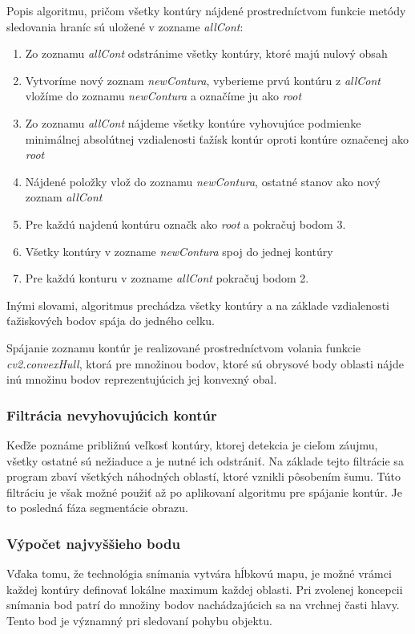 Popis algoritmu, pričom všetky kontúry nájdené prostredníctvom funkcie metódy sledovania hraníc sú uložené v zozname \textit{allCont}:
\begin{enumerate}
  \item Zo zoznamu \textit{allCont} odstránime všetky kontúry, ktoré majú nulový obsah
  \item Vytvoríme nový zoznam \textit{newContura}, vyberieme prvú kontúru z \textit{allCont} vložíme do zoznamu \textit{newContura} a označíme ju ako \textit{root}
  \item Zo zoznamu \textit{allCont} nájdeme všetky kontúre vyhovujúce podmienke minimálnej absolútnej vzdialenosti ťažísk kontúr oproti kontúre označenej ako \textit{root}  
  \item Nájdené položky vlož do zoznamu \textit{newContura}, ostatné stanov ako nový zoznam \textit{allCont}
  \item Pre každú najdenú kontúru označk ako \textit{root} a  pokračuj bodom 3.
  \item Všetky kontúry v zozname \textit{newContura} spoj do jednej kontúry
  \item Pre každú konturu v zozname \textit{allCont} pokračuj bodom 2.
  
\end{enumerate}
Inými slovami, algoritmus prechádza všetky kontúry a na základe vzdialenosti ťažiskových bodov spája do jedného celku.


Spájanie zoznamu kontúr je realizované prostredníctvom volania funkcie \textit{cv2.convexHull}, ktorá pre množinou bodov, ktoré sú  obrysové body oblasti nájde inú množinu bodov reprezentujúcich jej konvexný obal.

\subsubsection{Filtrácia nevyhovujúcich kontúr}  
Keďže poznáme približnú veľkosť kontúry, ktorej detekcia je cieľom záujmu, všetky ostatné sú nežiaduce a je nutné ich odstrániť. Na základe tejto filtrácie sa program zbaví všetkých náhodných oblastí, ktoré vznikli pôsobením šumu. Túto filtráciu je však možné použiť až po aplikovaní algoritmu pre spájanie kontúr. Je to posledná fáza segmentácie obrazu. 

\subsubsection{Výpočet najvyššieho bodu}
Vďaka tomu, že technológia snímania vytvára hĺbkovú mapu, je možné vrámci každej kontúry definovať lokálne maximum každej oblasti. Pri zvolenej koncepcii snímania bod patrí do množiny bodov nachádzajúcich sa na vrchnej časti hlavy. Tento bod je významný pri sledovaní pohybu objektu. \vspace{5mm}


